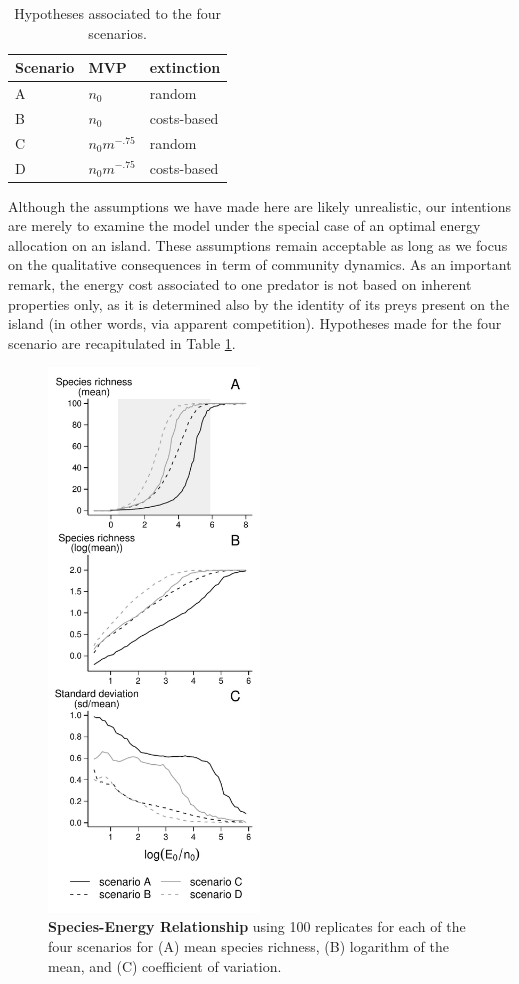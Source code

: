 \begin{table}
  \centering
  \caption{Hypotheses associated to the four scenarios.
  \label{tbl:scena}}
  \begin{tabular}{lll}
    Scenario & MVP & extinction \\ \hline
    A & \(n_0\) & random \\
    B & \(n_0\) & costs-based \\
    C & \(n_0m^{-.75}\) & random \\
    D & \(n_0m^{-.75}\) & costs-based
  \end{tabular}
\end{table}


Although the assumptions we have made here are likely unrealistic, our
intentions are merely to examine the model under the special case of an
optimal energy allocation on an island. These assumptions remain
acceptable as long as we focus on the qualitative consequences in term
of community dynamics. As an important remark, the energy cost
associated to one predator is not based on inherent properties only, as
it is determined also by the identity of its preys present on the island
(in other words, via apparent competition). Hypotheses made for the four
scenario are recapitulated in Table \ref{tbl:scena}.

\begin{figure}[htbp]
\centering
\includegraphics[width=0.5\textwidth]{chapitre4/fig/fig1.pdf}
\caption[Species-Energy Relationship]{\textbf{Species-Energy Relationship} using 100 replicates for
each of the four scenarios for (A) mean species richness, (B) logarithm
of the mean, and (C) coefficient of variation.\label{fig:etib1}}
\end{figure}


